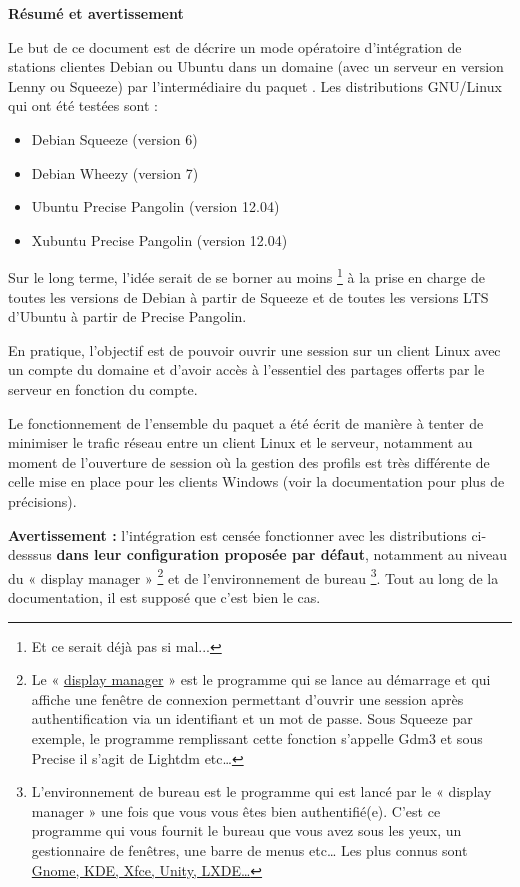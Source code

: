 \documentclass[french,a4paper,12pt]{article}
\begin{document}
\begin{center}
\begin{minipage}{0.8\linewidth}
\begin{center}
\Large
\textbf{Résumé et avertissement}
\end{center}
\setlength{\parindent}{2em}

Le but de ce document est de décrire un mode opératoire
d'intégration de stations clientes Debian ou
Ubuntu dans un domaine \Sedu (avec un serveur en version Lenny ou Squeeze)
par l'intermédiaire du paquet .
Les distributions GNU/Linux qui ont été testées sont :
%
\begin{itemize}
\item Debian Squeeze (version 6)
\item Debian Wheezy (version 7)
\item Ubuntu Precise Pangolin (version 12.04)
\item Xubuntu Precise Pangolin (version 12.04)
\end{itemize}
%
Sur le long terme, l'idée serait de se borner au moins%
%
\footnote{Et ce serait déjà pas si mal...}
%
à la prise en charge de
toutes les versions de Debian à partir de Squeeze et de toutes les versions LTS
d'Ubuntu à partir de Precise Pangolin.

En pratique, l'objectif est de pouvoir ouvrir une session sur un client Linux
avec un compte du domaine et d'avoir accès à l'essentiel des
partages offerts par le serveur \Sedu en fonction du compte.

Le fonctionnement de l'ensemble du paquet a été écrit de manière
à tenter de minimiser le trafic réseau entre un client Linux et
le serveur, notamment au moment de l'ouverture de session où
la gestion des profils est très différente de celle mise en place pour les
clients Windows (voir la documentation pour plus de précisions).

\textbf{Avertissement :} l'intégration est censée fonctionner avec les
distributions ci-desssus \textbf{dans leur configuration proposée par défaut},
notamment au niveau du « display manager »%
%
\footnote{Le « \href{https://fr.wikipedia.org/wiki/X_display_manager}{display manager} » est le programme qui se lance au démarrage et
qui affiche une fenêtre de connexion permettant d'ouvrir une session après
authentification via un identifiant et un mot de passe. Sous Squeeze par exemple, le
programme remplissant cette fonction s'appelle Gdm3 et sous Precise il s'agit
de Lightdm etc…}
%
et de l'environnement de bureau%
%
\footnote{L'environnement de bureau est le programme qui est lancé par le
« display manager » une fois que vous vous êtes bien authentifié(e). C'est ce
programme qui vous fournit le bureau que vous avez sous les yeux, un
gestionnaire de fenêtres, une barre de menus etc… Les plus
connus sont \href{https://fr.wikipedia.org/wiki/Environnement_de_bureau}{Gnome, KDE, Xfce, Unity, LXDE…}}. %
%
Tout au long de la documentation, il est supposé que c'est bien le
cas.


\end{minipage}
\end{center}
\end{document}
